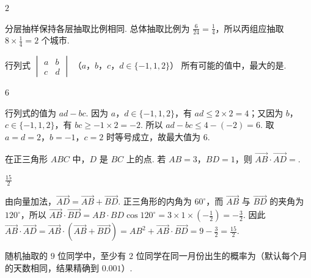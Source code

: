 \begin{answer}
\(2\)
\end{answer}

\begin{solution}
分层抽样保持各层抽取比例相同. 总体抽取比例为 \(\frac{6}{24}=\frac14\)，所以丙组应抽取 \(8\times\frac14=2\) 个城市.
\end{solution}

\begin{problem}
行列式 \(\begin{vmatrix}a & b\\ c & d \end{vmatrix}\) （\(a\)，\(b\)，\(c\)，\(d \in \{-1,1,2\}\)） 所有可能的值中，最大的是\fillinblank{}.
\end{problem}

\begin{answer}
\(6\)
\end{answer}

\begin{solution}
行列式的值为 \(ad-bc\). 因为 \(a\)，\(d\in\{-1,1,2\}\)，有 \(ad\leqslant2\times2=4\)；又因为 \(b\)，\(c\in\{-1,1,2\}\)，有 \(bc\geqslant-1\times2=-2\). 所以 \(ad-bc\leqslant4-(-2)=6\). 取 \(a=d=2\)，\(b=-1\)，\(c=2\) 时等号成立，故最大值为 \(6\).
\end{solution}

\begin{problem}
在正三角形 \(ABC\) 中，\(D\) 是 \(BC\) 上的点. 若 \(AB = 3\)，\(BD = 1\)，则 \(\overrightarrow{AB} \cdot \overrightarrow{AD} =\)\fillinblank{}.
\end{problem}

\begin{answer}
\(\frac{15}{2}\)
\end{answer}

\begin{solution}
由向量加法，\(\overrightarrow{AD}=\overrightarrow{AB}+\overrightarrow{BD}\). 正三角形的内角为 \(60^{\circ}\)，而 \(\overrightarrow{AB}\) 与 \(\overrightarrow{BD}\) 的夹角为 \(120^{\circ}\)，所以
\(\overrightarrow{AB}\cdot\overrightarrow{BD}=AB\cdot BD\cos120^{\circ}=3\times1\times\left(-\frac12\right)=-\frac32\). 因此
\(\overrightarrow{AB}\cdot\overrightarrow{AD}=\overrightarrow{AB}\cdot\left(\overrightarrow{AB}+\overrightarrow{BD}\right)=AB^2+\overrightarrow{AB}\cdot\overrightarrow{BD}=9-\frac32=\frac{15}{2}\).
\end{solution}

\begin{problem}
随机抽取的 \(9\) 位同学中，至少有 \(2\) 位同学在同一月份出生的概率为\fillinblank{}（默认每个月的天数相同，结果精确到 \(0.001\)）.
\end{problem}


